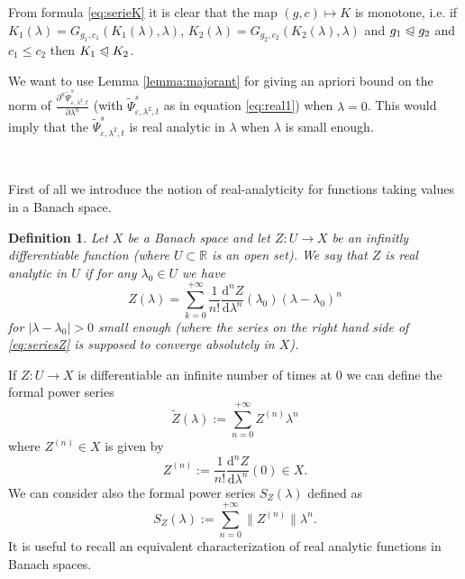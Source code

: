 \documentclass{article}
\newcommand{\assign}{:=}
\newcommand{\mathd}{\mathrm{d}}
\newtheorem{definition}[theorem]{Definition}
\begin{document}
\begin{remark}
  \label{remark:monotonicity}From formula {\eqref{eq:serieK}} it is clear that
  the map $(g, c) \mapsto K$ is monotone, i.e. if $K_1 (\lambda) = G_{g_1,
  c_1} (K_1 (\lambda), \lambda)$, $K_2 (\lambda) = G_{g_2, c_2} (K_2
  (\lambda), \lambda)$ and $g_1 \trianglelefteqslant g_2$ and $c_1 \leqslant
  c_2$ then $K_1 \trianglelefteqslant K_2$.
\end{remark}

We want to use Lemma \ref{lemma:majorant} for giving an apriori bound on the
norm of $\frac{\partial^n \tilde{\Psi}_{\varepsilon, \lambda^2, t}^s}{\partial
\lambda^n}$ (with $\tilde{\Psi}_{\varepsilon, \lambda^2, t}^s$ as in equation
{\eqref{eq:real1}}) when $\lambda = 0$. This would imply that the
$\tilde{\Psi}_{\varepsilon, \lambda^2, t}^s$ is real analytic in $\lambda$
when $\lambda$ is small enough.

\

First of all we introduce the notion of real-analyticity for functions taking
values in a Banach space.

\begin{definition}
  \label{definition:realanalytic}Let $X$ be a Banach space and let $Z : U
  \rightarrow X$ be an infinitly differentiable function (where $U \subset
  \mathbb{R}$ is an open set). We say that $Z$ is real analytic in $U$ if for
  any $\lambda_0 \in U$ we have
  \begin{equation}
    Z (\lambda) = \sum_{k = 0}^{+ \infty} \frac{1}{n!} \frac{\mathd^n
    Z}{\mathd \lambda^n} (\lambda_0) (\lambda - \lambda_0)^n
    \label{eq:seriesZ}
  \end{equation}
  for $| \lambda - \lambda_0 | > 0$ small enough (where the series on the
  right hand side of {\eqref{eq:seriesZ}} is supposed to converge absolutely
  in $X$).
\end{definition}

If $Z : U \rightarrow X$ is differentiable an infinite number of times at $0$
we can define the formal power series
\begin{equation}
  \tilde{Z} (\lambda) \assign \sum_{n = 0}^{+ \infty} Z^{(n)} \lambda^n
  \label{eq:expansionZ1}
\end{equation}
where $Z^{(n)} \in X$ is given by
\[ Z^{(n)} \assign \frac{1}{n!} \frac{\mathd^n Z}{\mathd \lambda^n} (0) \in X.
\]
We can consider also the formal power series $S_Z (\lambda)$ defined as
\begin{equation}
  S_Z (\lambda) \assign \sum_{n = 0}^{+ \infty} \| Z^{(n)} \| \lambda^n
  \label{eq:definitionS} .
\end{equation}
It is useful to recall an equivalent characterization of real analytic
functions in Banach spaces.
\end{document}
